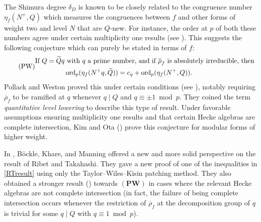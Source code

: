 \documentclass[a4paper, notitlepage, 10pt]{amsart}
\theoremstyle{plain} %
\theoremstyle{definition} %
\theoremstyle{remark} %
\numberwithin{equation}{section}
\newcommand{\ord}{\operatorname{ord}} %
\begin{document}
The Shimura degree $\delta_D$ is known to be closely related to the congruence number $\eta_f(N^+,Q)$ which measures the congruences between $f$ and other forms of weight two and level $N$ that are $Q$-new. For instance, the order at $p$ of both these numbers agree under certain multiplicity one results (see \cite{ASR}).
This suggests the following conjecture \cite[Conjecture 1.4]{PW11} which can purely be stated in terms of $f$: 
\begin{equation*}\tag{\textbf{PW}}\label{PW}
\begin{split}
     \text{If }Q=\widetilde{Q}q& \text{ with }q \text{ a prime number,} \text{ and if }\overline{\rho}_f \text{ is absolutely irreducible,} \text{ then } \\ &\ord_p(\eta_f(N^+q,\widetilde{Q}))=c_{q} + \ord_p(\eta_f(N^+,Q)). 
\end{split}
\end{equation*}
Pollack and Weston proved this under certain conditions (see \cite[Theorem 6.11]{PW11}), notably requiring $\overline{\rho}_f $ to be ramified at $q$ whenever $q\mid Q$ and $q\equiv \pm 1 \bmod p$. They coined the term \emph{quantitative level lowering} to describe this type of result. Under favorable assumptions ensuring multiplicity one results and that certain Hecke algebras are complete intersection, Kim and Ota (\cite{KO19}) prove this conjecture for modular forms of higher weight.


In \cite{BKM2}, Böckle, Khare, and Manning offered a new and more solid perspective on the result of Ribet and Takahashi. They gave a new proof of one of the inequalities in \eqref{RTresult} using only the Taylor--Wiles--Kisin patching method. They also obtained a stronger result (\cite[Theorem 7.4]{BKM2}) towards $(\textbf{PW})$ in cases where the relevant Hecke algebras are not complete intersection (in fact, the failure of being complete intersection occurs whenever the restriction of $\overline{\rho}_f$ at the decomposition group of $q$ is trivial for some $q\mid Q$ with $q\equiv 1 \bmod p$).
\end{document}
